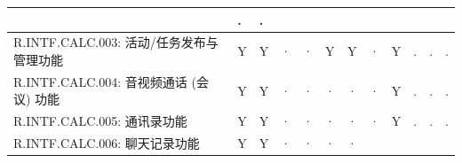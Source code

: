 \begin{table}[htbp]
\begin{tabular}{|p{9em}|p{2em}|p{2em}|p{2em}|p{2em}|p{2em}|
                            p{2em}|p{2em}|p{2em}|p{2em}|p{2em}|p{2em}|}
                & .                     & . \\
            \hline %
            R.INTF.CALC.003: 活动/任务发布与管理功能
                & Y                     & Y                 & · 
                & ·                     & Y                 & Y 
                & ·                     & Y                 & .
                & .                     & . \\
            \hline %
            R.INTF.CALC.004: 音视频通话 (会议) 功能
                & Y                     & Y                 & · 
                & ·                     & ·                 & · 
                & ·                     & Y                 & .
                & .                     & . \\
            \hline %
            R.INTF.CALC.005: 通讯录功能
                & Y                     & Y                 & · 
                & ·                     & ·                 & · 
                & ·                     & Y                 & .
                & .                     & . \\
            \hline %
            R.INTF.CALC.006: 聊天记录功能
                & Y                     & Y                 & · 
                & ·                     & ·                 & · 

\end{tabular}
\end{table}
